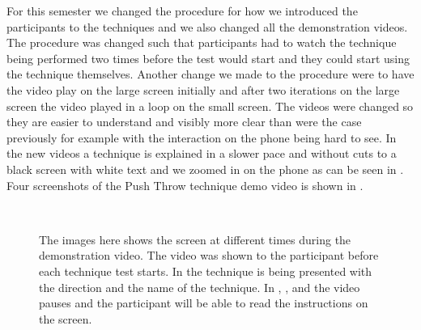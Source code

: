 For this semester we changed the procedure for how we introduced the participants to the techniques and we also changed all the demonstration videos.
The procedure was changed such that participants had to watch the technique being performed two times before the test would start and they could start using the technique themselves.
Another change we made to the procedure were to have the video play on the large screen initially and after two iterations on the large screen the video played in a loop on the small screen.
The videos were changed so they are easier to understand and visibly more clear than were the case previously for example with the interaction on the phone being hard to see.
In the new videos a technique is explained in a slower pace and without cuts to a black screen with white text and we zoomed in on the phone as can be seen in .
Four screenshots of the Push Throw technique demo video is shown in .

\begin{figure}[H]
\\
\caption{The images here shows the screen at different times during the demonstration video. The video was shown to the participant before each technique test starts. In \protect{} the technique is being presented with the direction and the name of the technique. In \protect{}, \protect{}, and \protect{} the video pauses and the participant will be able to read the instructions on the screen.}
\label{fig:demovideo}
\end{figure}

